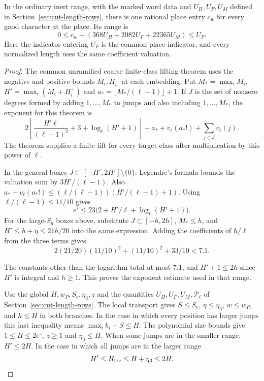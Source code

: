 \begin{proposition}\label{prop:ordinary-inert-place-entry}
In the ordinary inert range, with the marked word data and
\(U_H,U_F,U_M\) defined in Section~\ref{sec:cut-length-rows},
there is one rational place entry \(c_w\) for every good character at the place. Its range is
\[
 0\le c_w-(368U_H+2082U_F+22365U_M)\le U_F.
\]
Here the indicator entering \(U_F\) is the common place indicator,
and every normalized length uses the same coefficient valuation.
\end{proposition}

\begin{proof}
The common unramified coarse finite-class lifting theorem uses the
negative and positive bounds \(M_i,H_i^+\) at each embedding.
Put \(M_*=\max_i M_i\), \(H'=\max_i(M_i+H_i^+)\)
and \(a_*=\lfloor M_*/(\ell-1)\rfloor+1\).
If \(J\) is the set of nonzero degrees formed by adding
\(1,\ldots,M_*\) to jumps and also including \(1,\ldots,M_*\),
the exponent for this theorem is
\[
  2\left\lfloor\frac{H'\ell}{(\ell-1)^2}+3+
                        \log_\ell(H'+1)\right\rfloor
       + a_*+v_\ell(a_*!) +\sum_{j\in J}v_\ell(j).
\]
The theorem supplies a finite lift for every target class after
multiplication by this power of \(\ell\).

In the general boxes \(J\subset[-H',2H']\setminus\{0\}\).
Legendre's formula bounds the valuation sum by \(3H'/(\ell-1)\).
Also
\(a_*+v_\ell(a_*!)\le(\ell/(\ell-1))(H'/(\ell-1)+1)\).
Using \(\ell/(\ell-1)\le11/10\) gives
\[
 e'\le23\bigl(2+H'/\ell+\log_\ell(H'+1)\bigr).
\]
For the large-\(S_g\) boxes above, substitute \(J\subset[-h,2h]\),
\(M_*\le h\), and \(H'\le h+\eta\le21h/20\) into the same
expression. Adding the coefficients of \(h/\ell\) from the three terms gives
\[
 2(21/20)(11/10)^2+(11/10)^2+33/10<7.1.
\]

The constants other than the logarithm total at most \(7.1\),
and \(H'+1\le2h\) since \(H'\) is integral and \(h\ge1\).
This proves the exponent estimate used in that range.

Use the global \(H,w_P,S_c,\eta_3,z\) and the quantities
\(U_H,U_F,U_M,\mathcal P_\ell\) of
Section~\ref{sec:cut-length-rows}. The local transport gives
\(S\le S_c\), \(\eta\le\eta_3\), \(w\le w_P\), and \(h\le H\)
in both branches. In the case in which every position has larger jumps this last inequality
means \(\max_i b_i+S\le H\). The polynomial size bounds give
\(1\le H\le2e^z\), \(z\ge1\) and \(\eta_3\le H\).
When some jumps are in the smaller range, \(H'\le2H\). In the
case in which all jumps are in the larger range
\[
 H'\le H_{\rm loc}\le H+\eta_3\le2H.
\]


\end{proof}
